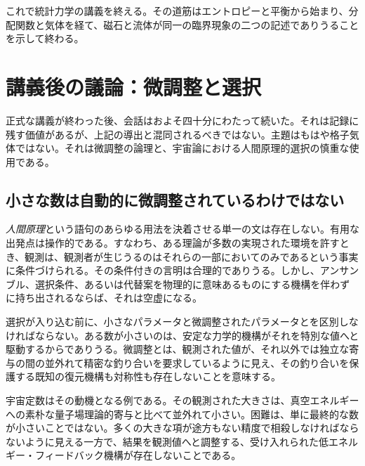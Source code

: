 これで統計力学の講義を終える。その道筋はエントロピーと平衡から始まり、分配関数と気体を経て、磁石と流体が同一の臨界現象の二つの記述でありうることを示して終わる。

\section{講義後の議論：微調整と選択}

正式な講義が終わった後、会話はおよそ四十分にわたって続いた。それは記録に残す価値があるが、上記の導出と混同されるべきではない。主題はもはや格子気体ではない。それは微調整の論理と、宇宙論における人間原理的選択の慎重な使用である。

\subsection{小さな数は自動的に微調整されているわけではない}

\emph{人間原理}という語句のあらゆる用法を決着させる単一の文は存在しない。有用な出発点は操作的である。すなわち、ある理論が多数の実現された環境を許すとき、観測は、観測者が生じうるのはそれらの一部においてのみであるという事実に条件づけられる。その条件付きの言明は合理的でありうる。しかし、アンサンブル、選択条件、あるいは代替案を物理的に意味あるものにする機構を伴わずに持ち出されるならば、それは空虚になる。

選択が入り込む前に、小さなパラメータと微調整されたパラメータとを区別しなければならない。ある数が小さいのは、安定な力学的機構がそれを特別な値へと駆動するからでありうる。微調整とは、観測された値が、それ以外では独立な寄与の間の並外れて精密な釣り合いを要求しているように見え、その釣り合いを保護する既知の復元機構も対称性も存在しないことを意味する。

\begin{classroomqa}
\end{classroomqa}

宇宙定数はその動機となる例である。その観測された大きさは、真空エネルギーへの素朴な量子場理論的寄与と比べて並外れて小さい。困難は、単に最終的な数が小さいことではない。多くの大きな項が途方もない精度で相殺しなければならないように見える一方で、結果を観測値へと調整する、受け入れられた低エネルギー・フィードバック機構が存在しないことである。

